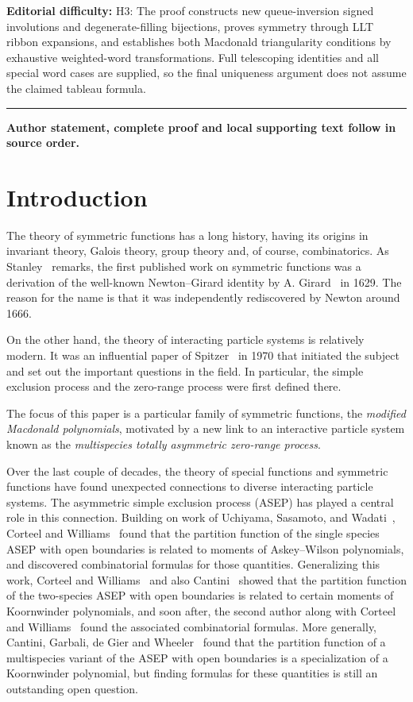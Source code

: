 \documentclass[11pt]{article}
\theoremstyle{definition}
\numberwithin{equation}{section}
\begin{document}
\par\noindent\textbf{Editorial difficulty:} H3: The proof constructs new queue-inversion signed involutions and degenerate-filling bijections, proves symmetry through LLT ribbon expansions, and establishes both Macdonald triangularity conditions by exhaustive weighted-word transformations. Full telescoping identities and all special word cases are supplied, so the final uniqueness argument does not assume the claimed tableau formula.
\medskip\hrule\medskip
\noindent\textbf{Author statement, complete proof and local supporting text follow in source order.}
\section{Introduction}


The theory of symmetric functions has a long history, having its origins in invariant theory, Galois theory, group theory and, of course, combinatorics. As Stanley~\cite[Notes in Chapter~7]{stanley-ec2} remarks, the first published work on symmetric functions was a derivation of the well-known Newton--Girard identity by A. Girard~\cite{girard-1884} in 1629. The reason for the name is that it was independently rediscovered by Newton around 1666. 

On the other hand, the theory of interacting particle systems is relatively modern. It was an influential paper of Spitzer~\cite{spitzer-1970} in 1970 that initiated the subject and set out the important questions in the field. In particular, the simple exclusion process and the zero-range process were first defined there. 

The focus of this paper is a particular family of symmetric functions, 
the \emph{modified Macdonald polynomials}, motivated by a new link 
to an interactive particle system known as the \emph{multispecies totally
asymmetric zero-range process}. 

Over the last couple of decades, the theory of special functions and symmetric functions have found unexpected connections to diverse interacting particle systems. The asymmetric simple exclusion process  (ASEP) has played a central role in this connection. Building on work of Uchiyama, Sasamoto, and Wadati~\cite{USW,sasamoto-1999}, Corteel and Williams~\cite{CW11} found that the partition function of the single species ASEP with open boundaries is related to moments of Askey--Wilson polynomials, and discovered combinatorial formulas for those quantities. Generalizing this work, Corteel and Williams~\cite{CW18} and also Cantini~\cite{cantini-2017} showed that the partition function of the two-species ASEP with open boundaries is related to certain moments of Koornwinder polynomials, and soon after, the second author along with Corteel and Williams~\cite{CMW-2017} found the associated combinatorial formulas. More generally, Cantini, Garbali, de Gier and Wheeler~\cite{cantini-etal-2016} found that the partition function of a multispecies variant of the ASEP with open boundaries is a specialization of a Koornwinder polynomial, but finding formulas for these quantities is still an outstanding open question.
\end{document}
